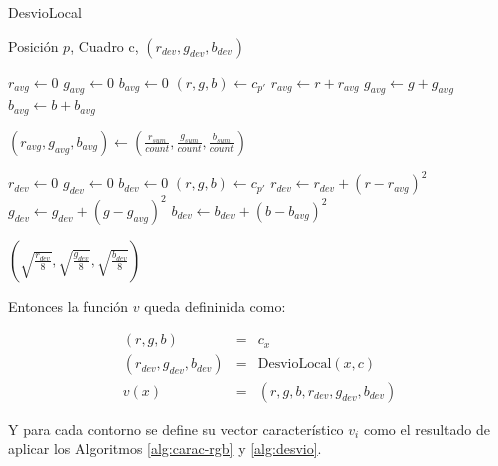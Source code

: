 \begin{algorithm}[H]
    \caption{DesvioLocal}
    \label{alg:desvio-local}
    \begin{algorithmic}
    \Require\hspace{\algorithmicindent}\hspace{\algorithmicindent}Posición $p$, Cuadro c,
    \Ensure\hspace{\algorithmicindent}\hspace{0.23cm} $(r_{dev}, g_{dev}, b_{dev})$
    \State

    \State $r_{avg} \gets 0$
    \State $g_{avg} \gets 0$
    \State $b_{avg} \gets 0$
        \State $(r, g, b) \gets c_{p'}$
        \State $r_{avg} \gets r + r_{avg}$
        \State $g_{avg} \gets g + g_{avg}$
        \State $b_{avg} \gets b + b_{avg}$
    \EndFor

    \State $(r_{avg}, g_{avg}, b_{avg}) \gets (\frac{r_{sum}}{count}, \frac{g_{sum}}{count}, \frac{b_{sum}}{count}) $

    \State $r_{dev} \gets 0$
    \State $g_{dev} \gets 0$
    \State $b_{dev} \gets 0$
        \State $(r, g, b) \gets c_{p'}$
        \State $r_{dev} \gets r_{dev} + (r - r_{avg})^2$
        \State $g_{dev} \gets g_{dev} + (g - g_{avg})^2$
        \State $b_{dev} \gets b_{dev} + (b - b_{avg})^2$
    \EndFor

    \State \Return $ (\sqrt{\frac{r_{dev}}{8}}, \sqrt{\frac{g_{dev}}{8}}, \sqrt{\frac{b_{dev}}{8}}) $

    \end{algorithmic}
\end{algorithm}

Entonces la función $v$ queda defininida como:

\begin{eqnarray*}
    (r, g, b) &=&  c_{x} \\
    (r_{dev}, g_{dev}, b_{dev}) &=& \text{DesvioLocal}(x, c) \\
    v(x) &=& (r, g, b, r_{dev}, g_{dev}, b_{dev})
\end{eqnarray*}

Y para cada contorno se define su vector característico $v_i$ como el resultado de aplicar
los Algoritmos \ref{alg:carac-rgb} y \ref{alg:desvio}.

